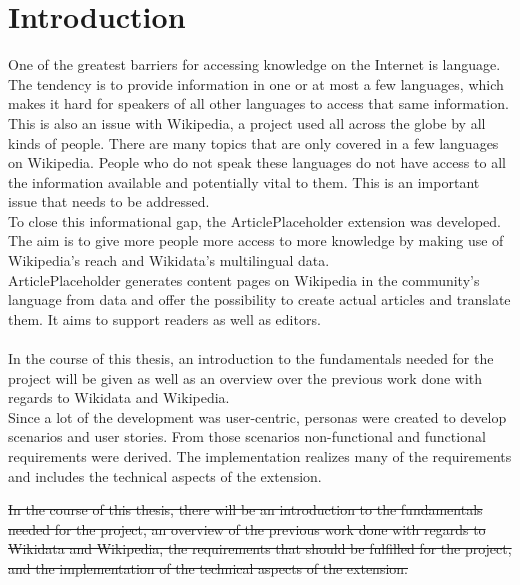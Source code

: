 \chapter{Introduction}

One of the greatest barriers for accessing knowledge on the Internet is language. The tendency is to provide information in one or at most a few languages, which makes it hard for speakers of all other languages to access that same information. This is also an issue with Wikipedia, a project used all across the globe by all kinds of people. There are many topics that are only covered in a few languages on Wikipedia. People who do not speak these languages do not have access to all the information available and potentially vital to them. This is an important issue that needs to be addressed. \\

To close this informational gap, the ArticlePlaceholder extension was developed. The aim is to give more people more access to more knowledge by making use of Wikipedia’s reach and Wikidata’s multilingual data. \\
ArticlePlaceholder generates content pages on Wikipedia in the community's language from data and offer the possibility to create actual articles and translate them. It aims to support readers as well as editors. \\
\\
In the course of this thesis, an introduction to the fundamentals needed for the project will be given as well as an overview over the previous work done with regards to Wikidata and Wikipedia. \\
Since a lot of the development was user-centric, personas were created to develop scenarios and user stories. From those scenarios non-functional and functional requirements were derived. The implementation realizes many of the requirements and includes the technical aspects of the extension.

\st{In the course of this thesis, there will be an introduction to the fundamentals needed for the project, an overview of the previous work done with regards to Wikidata and Wikipedia, the requirements that should be fulfilled for the project, and the implementation of the technical aspects of the extension.} 